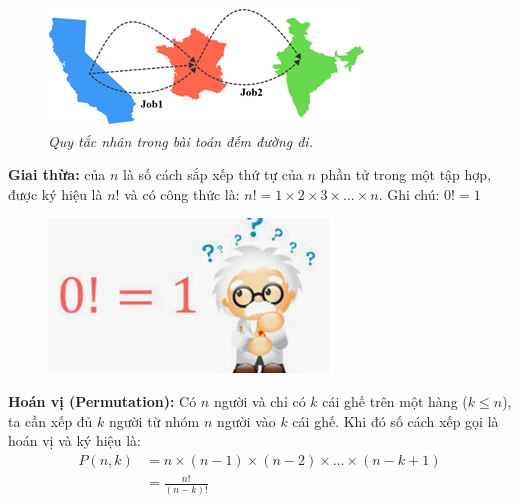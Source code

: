 \begin{multicols}{2}
\begin{figure}[H]
		\vspace*{-5pt}
		\captionsetup{labelformat=empty, justification=centering}
		\includegraphics[width=1\linewidth]{_2}
		\caption{\small\textit{\color{toancuabi}Quy tắc nhân trong bài toán đếm đường đi.}}
		\vspace*{-10pt}
	\end{figure}
	\textbf{\color{toancuabi}Giai thừa:} của $n$ là số cách sắp xếp thứ tự của $n$ phần tử trong một tập hợp, được ký hiệu là $n!$ và có công thức là: $n!=1\times 2\times 3\times \ldots\times n $.
	\vskip 0.1cm
	Ghi chú: $0!=1$
	\begin{figure}[H]
		\centering
		\vspace*{-5pt}
		\captionsetup{labelformat=empty, justification=centering}
		\includegraphics[width=1\linewidth]{_3}
		\vspace*{-15pt}
	\end{figure}
	\textbf{\color{toancuabi}Hoán vị (Permutation):} Có $n$ người và chỉ có $k$ cái ghế trên một hàng ($k\le n$), ta cần xếp đủ $k$ người từ nhóm $n$ người vào $k$ cái ghế. Khi đó số cách xếp gọi là hoán vị và ký hiệu là:
	\begin{align*}
		P(n,k)&=n\!\times\!(n\!-\!1)\!\!\times\!\!(n\!-\!2)\!\!\times\!\!\ldots\!\!\times\!\!(n\!-\!k\!+\!1\!)\\
		&= \frac{n!}{(n-k)!} 
	\end{align*}

\end{multicols}

